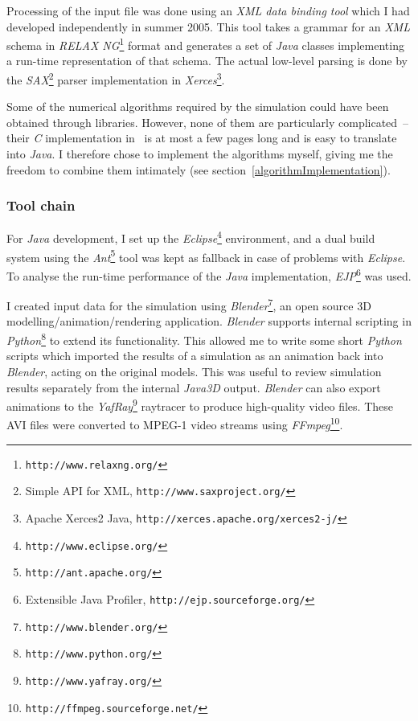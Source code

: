 Processing of the input file was done using an \textsl{XML data binding tool} which I had
developed independently in summer 2005. This tool takes a grammar for an \textsl{XML} schema in
\textsl{RELAX NG}\footnote{\texttt{http://www.relaxng.org/}} format and generates a set of
\textsl{Java} classes implementing a run-time representation of that schema. The actual low-level parsing
is done by the \textsl{SAX}\footnote{Simple API for XML, \texttt{http://www.saxproject.org/}}
parser implementation in \textsl{Xerces}\footnote{Apache Xerces2 Java,
\texttt{http://xerces.apache.org/xerces2-j/}}.

Some of the numerical algorithms required by the simulation could have been obtained through
libraries. However, none of them are particularly complicated~-- their \textsl{C} implementation
in~\cite{NRinC} is at most a few pages long and is easy to translate into \textsl{Java}. I
therefore chose to implement the algorithms myself, giving me the freedom to combine them
intimately (see section~\ref{algorithmImplementation}).

\subsubsection{Tool chain}
For \textsl{Java} development, I set up the \textsl{Eclipse}\footnote{\texttt{http://www.eclipse.org/}}
environment, and a dual build system using the \textsl{Ant}\footnote{\texttt{http://ant.apache.org/}}
tool was kept as fallback in case of problems with \textsl{Eclipse}. To analyse the run-time
performance of the \textsl{Java} implementation,
\textsl{EJP}\footnote{Extensible Java Profiler, \texttt{http://ejp.sourceforge.org/}} was used.

I created input data for the simulation using \textsl{Blender}\footnote{\texttt{http://www.blender.org/}},
an open source 3D modelling/\-ani\-ma\-tion/\-ren\-de\-ring application. \textsl{Blender} supports internal
scripting in \textsl{Python}\footnote{\texttt{http://www.python.org/}} to extend its functionality.
This allowed me to write some short \textsl{Python} scripts which imported the results of a
simulation as an animation back into \textsl{Blender}, acting on the original models. This was useful
to review simulation results separately from the internal \textsl{Java3D} output. \textsl{Blender}
can also export animations to the \textsl{YafRay}\footnote{\texttt{http://www.yafray.org/}}
raytracer to produce high-quality video files. These AVI files were converted to MPEG-1 video
streams using \textsl{FFmpeg}\footnote{\texttt{http://ffmpeg.sourceforge.net/}}.

